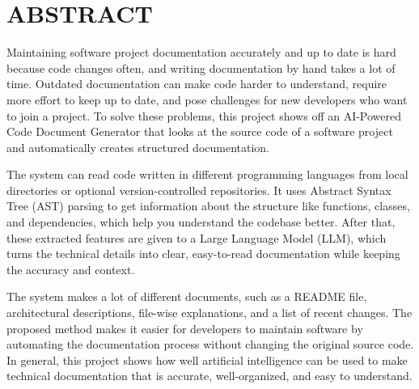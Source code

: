 \chapter*{\rm \large \bf ABSTRACT}
\vspace{3.0mm}
\begin{justify}

\hspace{0.5cm}Maintaining software project documentation accurately and up to date is hard because code changes often, and writing documentation by hand takes a lot of time. Outdated documentation can make code harder to understand, require more effort to keep up to date, and pose challenges for new developers who want to join a project. To solve these problems, this project shows off an AI-Powered Code Document Generator that looks at the source code of a software project and automatically creates structured documentation.
\par The system can read code written in different programming languages from local directories or optional version-controlled repositories. It uses Abstract Syntax Tree (AST) parsing to get information about the structure like functions, classes, and dependencies, which help you understand the codebase better. After that, these extracted features are given to a Large Language Model (LLM), which turns the technical details into clear, easy-to-read documentation while keeping the accuracy and context.

\par The system makes a lot of different documents, such as a README file, architectural descriptions, file-wise explanations, and a list of recent changes. The proposed method makes it easier for developers to maintain software by automating the documentation process without changing the original source code. In general, this project shows how well artificial intelligence can be used to make technical documentation that is accurate, well-organized, and easy to understand.
\end{justify}